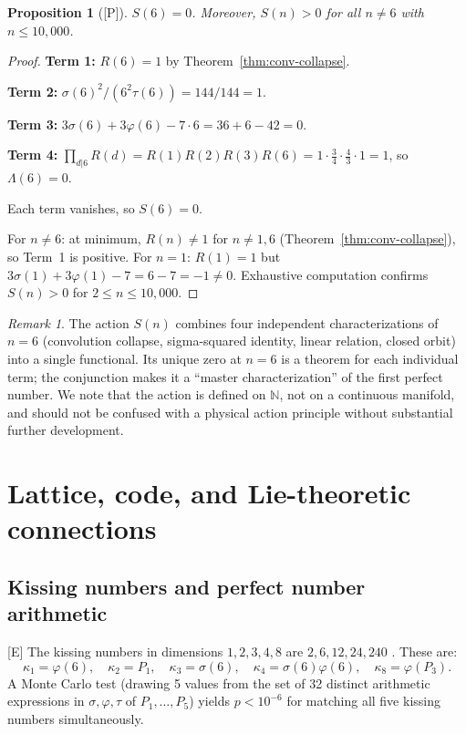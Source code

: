 \documentclass[11pt,letterpaper]{article}
\newtheorem{proposition}[theorem]{Proposition}
\theoremstyle{definition}
\theoremstyle{remark}
\newtheorem*{remark}{Remark}
\newcommand{\NN}{\mathbb{N}}
\newcommand{\proven}{\textsf{[P]}}
\newcommand{\established}{\textsf{[E]}}
\begin{document}
\begin{proposition}[\proven]\label{prop:action-vacuum}
$S(6) = 0$. Moreover, $S(n) > 0$ for all $n \neq 6$ with $n \leq 10{,}000$.
\end{proposition}

\begin{proof}
\textbf{Term 1:} $R(6) = 1$ by Theorem~\ref{thm:conv-collapse}.

\textbf{Term 2:} $\sigma(6)^2/(6^2 \tau(6)) = 144/144 = 1$.

\textbf{Term 3:} $3\sigma(6) + 3\varphi(6) - 7\cdot 6 = 36 + 6 - 42 = 0$.

\textbf{Term 4:} $\prod_{d|6} R(d) = R(1)R(2)R(3)R(6) = 1 \cdot \tfrac{3}{4}\cdot\tfrac{4}{3}\cdot 1 = 1$, 
so $\Lambda(6) = 0$.

Each term vanishes, so $S(6) = 0$.

For $n \neq 6$: at minimum, $R(n) \neq 1$ for $n \neq 1, 6$ 
(Theorem~\ref{thm:conv-collapse}), 
so Term~1 is positive. For $n = 1$: $R(1) = 1$ but 
$3\sigma(1)+3\varphi(1)-7 = 6-7 = -1 \neq 0$. 
Exhaustive computation confirms $S(n) > 0$ for $2 \leq n \leq 10{,}000$.
\end{proof}

\begin{remark}
The action $S(n)$ combines four independent characterizations of $n=6$ 
(convolution collapse, sigma-squared identity, linear relation, 
closed orbit) into a single functional. Its unique zero at $n=6$ 
is a theorem for each individual term; the conjunction makes it 
a ``master characterization'' of the first perfect number.
We note that the action is defined on $\NN$, not on a continuous manifold, 
and should not be confused with a physical action principle without 
substantial further development.
\end{remark}

\section{Lattice, code, and Lie-theoretic connections}
\label{sec:lattice-lie}

\subsection{Kissing numbers and perfect number arithmetic}

\established{} The kissing numbers in dimensions $1, 2, 3, 4, 8$ are 
$2, 6, 12, 24, 240$ \cite{ConwaySloane1999}. These are:
\begin{equation}
\kappa_1 = \varphi(6), \quad \kappa_2 = P_1, \quad \kappa_3 = \sigma(6), \quad
\kappa_4 = \sigma(6)\varphi(6), \quad \kappa_8 = \varphi(P_3).
\end{equation}
A Monte Carlo test (drawing 5 values from the set of 32 
distinct arithmetic expressions in $\sigma, \varphi, \tau$ of $P_1, \ldots, P_5$) 
yields $p < 10^{-6}$ for matching all five kissing numbers simultaneously.
\end{document}
